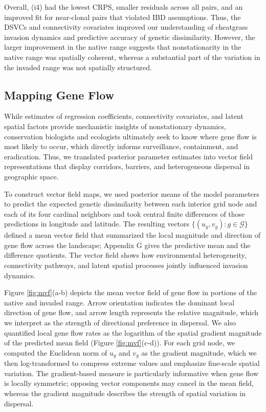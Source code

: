 \documentclass{article}
\begin{document}
Overall, (i4) had the lowest CRPS, smaller residuals across all pairs, and an improved fit for near-clonal pairs that violated IBD assumptions. Thus, the DSVCs and connectivity covariates improved our understanding of cheatgrass invasion dynamics and predictive accuracy of genetic dissimilarity. However, the larger improvement in the native range suggests that nonstationarity in the native range was spatially coherent, whereas a substantial part of the variation in the invaded range was not spatially structured.


\subsection{Mapping Gene Flow}

While estimates of regression coefficients, connectivity covariates, and latent spatial factors provide mechanistic insights of nonstationary dynamics, conservation biologists and ecologists ultimately seek to know where gene flow is most likely to occur, which directly informs surveillance, containment, and eradication.
Thus, we translated posterior parameter estimates into vector field representations that display corridors, barriers, and heterogeneous dispersal in geographic space.  

To construct vector field maps, we used posterior means of the model parameters to predict the expected genetic dissimilarity between each interior grid node and each of its four cardinal neighbors and took central finite differences of those predictions in longitude and latitude. The resulting vectors $\{(u_g,v_g):g\in\mathcal{G}\}$ defined a mean vector field that summarized the local magnitude and direction of gene flow across the landscape; Appendix G gives the predictive mean and the difference quotients.  
The vector field shows how environmental heterogeneity, connectivity pathways, and latent spatial processes jointly influenced invasion dynamics. 

Figure \ref{fig:mvf}(a-b) depicts the mean vector field of gene flow in portions of the native and invaded range. 
Arrow orientation indicates the dominant local direction of gene flow, and arrow length represents the relative magnitude, which we interpret as the strength of directional preference in dispersal.
We also quantified local gene flow rates as the logarithm of the spatial gradient magnitude of the predicted mean field (Figure \ref{fig:mvf}(c-d)). For each grid node, we computed the Euclidean norm of $u_g$ and $v_g$ as the gradient magnitude, which we then log-transformed to compress extreme values and emphasize fine-scale spatial variation. The gradient-based measure is particularly informative when gene flow is locally symmetric; opposing vector components may cancel in the mean field, whereas the gradient magnitude describes the strength of spatial variation in dispersal.
\end{document}
